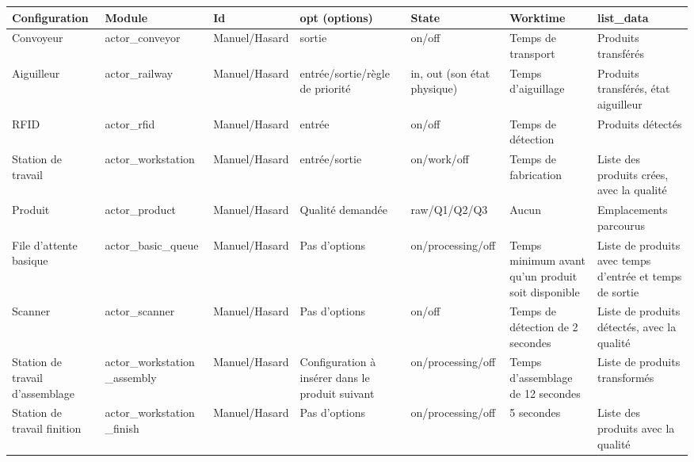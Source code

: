 \documentclass[12pt,a4paper]{article}
\begin{document}
	\begin{landscape}
		\begin{center}
			\begin{tabularx}{1.55\textwidth}{|X|X|X|X|X|X|X|}
				\hline
				Configuration & 
				Module & 
				Id & 
				opt (options) & 
				State & 
				Worktime & 
				list\_data \\
				\hline
				Convoyeur & 
				actor\_conveyor & 
				Manuel/Hasard & 
				sortie & 
				on/off & 
				Temps de transport & 
				Produits transférés \\
				\hline
				Aiguilleur & 
				actor\_railway & 
				Manuel/Hasard & 
				entrée/sortie/règle de priorité & 
				{in, out} (son état physique) & 
				Temps d'aiguillage & 
				Produits transférés, état aiguilleur \\
				\hline
				RFID & 
				actor\_rfid & 
				Manuel/Hasard & 
				entrée & 
				on/off & 
				Temps de détection & 
				Produits détectés\\
				\hline
				Station de travail & 
				actor\_workstation & 
				Manuel/Hasard & 
				entrée/sortie & 
				on/work/off & 
				Temps de fabrication & 
				Liste des produits crées, avec la qualité \\
				\hline
				Produit & 
				actor\_product & 
				Manuel/Hasard & 
				Qualité demandée & 
				raw/Q1/Q2/Q3 & 
				Aucun & 
				Emplacements parcourus \\
				\hline
				File d'attente basique & 
				actor\_basic\_queue & 
				Manuel/Hasard & 
				Pas d'options & 
				on/processing/off & 
				Temps minimum avant qu'un produit soit disponible & 
				Liste de produits avec temps d'entrée et temps de sortie \\
				\hline
				Scanner &
				actor\_scanner &
				Manuel/Hasard &
				Pas d'options &
				on/off &
				Temps de détection de 2 secondes &
				Liste de produits détectés, avec la qualité \\
				\hline
				Station de travail d'assemblage & 
				actor\_workstation \_assembly & 
				Manuel/Hasard &
				Configuration à insérer dans le produit suivant &
				on/processing/off &
				Temps d'assemblage de 12 secondes &
				Liste de produits transformés \\
				\hline
				Station de travail finition &
				actor\_workstation \_finish &
				Manuel/Hasard &
				Pas d'options &
				on/processing/off &
				5 secondes &
				Liste des produits avec la qualité \\
				\hline
			\end{tabularx}
		\end{center}
	
	\end{landscape}
\end{document}
